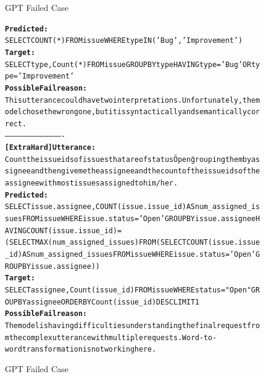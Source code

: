 \begin{figure}[H]
\begin{AIbox}{GPT Failed Case}
{\begin{alltt}
                {\bf Predicted:} \\
                SELECT COUNT(*)  FROM issue  WHERE type IN ('Bug', 'Improvement')
                \\
                {\bf Target:} \\
                SELECT type, Count(*) FROM issue GROUP BY type HAVING type = 'Bug' OR type = 'Improvement'
                \\
                {\bf Possible Fail reason:} \\
                This utterance could have two interpretations. Unfortunately, the model chose the wrong one, but it is syntactically and semantically correct.
                \\
                ----------------------------------------
                \\
                {\bf [Extra Hard] Utterance:} \\
                Count the issue ids of issues that are of status \"Open\" grouping them by assignee and then give me the assignee and the count of the issue ids of the assignee with most issues assigned to him/her.
                \\
                {\bf Predicted:} \\
                SELECT issue.assignee, COUNT(issue.issue\_id) AS num\_assigned\_issues FROM issue WHERE issue.status = 'Open' GROUP BY issue.assignee HAVING COUNT(issue.issue\_id) = (     SELECT MAX(num\_assigned\_issues) FROM ( SELECT COUNT(issue.issue\_id) AS num\_assigned\_issues FROM issue WHERE issue.status = 'Open' GROUP BY issue.assignee ))
                \\
                {\bf Target:} \\
                SELECT assignee, Count(issue\_id) FROM issue WHERE status = "Open" GROUP BY assignee ORDER BY Count(issue\_id) DESC LIMIT 1
                \\
                {\bf Possible Fail reason:} \\
                The model is having difficulties understanding the final request from the complex utterance with multiple requests. Word-to-word transformation is not working here.
            \end{alltt}
        }
        \vspace{-5px}
    \end{AIbox}
    \caption{GPT Failed Case}
\end{figure}

